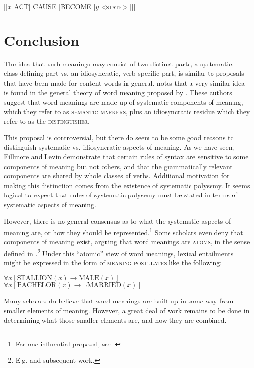 \ea \label{ex:7.33}
{}[[$x$ ACT] CAUSE [BECOME [$y$ <\textsc{state}> ]]]
\z

\section{Conclusion}\label{sec:7.6}

The idea that verb meanings may consist of two distinct parts, a systematic, class-defining part vs. an idiosyncratic, verb-specific part, is similar to proposals that have been made for content words in general. \citet[131]{Fillmore1970} notes that a very similar idea is found in the general theory of word meaning proposed by \citet{KatzFodor1963}. These authors suggest that word meanings are made up of systematic components of meaning, which they refer to as \textsc{semantic markers}, plus an idiosyncratic residue which they refer to as the \textsc{distinguisher}.



This proposal is controversial, but there do seem to be some good reasons to distinguish systematic vs. idiosyncratic aspects of meaning. As we have seen, Fillmore and Levin demonstrate that certain rules of syntax are sensitive to some components of meaning but not others, and that the grammatically relevant components are shared by whole classes of verbs. Additional motivation for making this distinction comes from the existence of systematic polysemy. It seems logical to expect that rules of systematic polysemy must be stated in terms of systematic aspects of meaning.



However, there is no general consensus as to what the systematic aspects of meaning are, or how they should be represented.\footnote{For one influential proposal, see \citet{Pustejovsky1995}.} Some scholars even deny that components of meaning exist, arguing that word meanings are \textsc{atoms}, in the sense defined in .\footnote{E.g. \citet{Fodor1975} and subsequent work.} Under this “atomic” view of word meanings, lexical entailments might be expressed in the form of \textsc{meaning postulates} like the following:


\ea
$\forall x[\text{STALLION}(x) \rightarrow \text{MALE}(x)]$\\
$\forall x[\text{BACHELOR}(x) \rightarrow \neg\text{MARRIED}(x)]$
\z


Many scholars do believe that word meanings are built up in some way from smaller elements of meaning. However, a great deal of work remains to be done in determining what those smaller elements are, and how they are combined.



